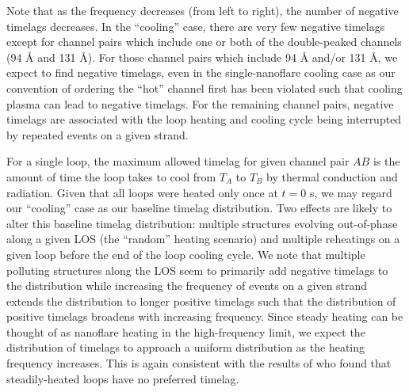 Note that as the frequency decreases (from left to right), the number of negative timelags decreases. In the ``cooling'' case, there are very few negative timelags except for channel pairs which include one or both of the double-peaked channels (94 \AA{} and 131 \AA{}). For those channel pairs which include 94 \AA{} and/or 131 \AA{}, we expect to find negative timelags, even in the single-nanoflare cooling case as our convention of ordering the ``hot'' channel first has been violated such that cooling plasma can lead to negative timelags. For the remaining channel pairs, negative timelags are associated with the loop heating and cooling cycle being interrupted by repeated events on a given strand. 

For a single loop, the maximum allowed timelag for given channel pair $AB$ is the amount of time the loop takes to cool from $T_A$ to $T_B$ by thermal conduction and radiation. Given that all loops were heated only once at $t=0$ s, we may regard our ``cooling'' case as our baseline timelag distribution. Two effects are likely to alter this baseline timelag distribution: multiple structures evolving out-of-phase along a given LOS (the ``random'' heating scenario) and multiple reheatings on a given loop before the end of the loop cooling cycle. We note that multiple polluting structures along the LOS seem to primarily add negative timelags to the distribution while increasing the frequency of events on a given strand extends the distribution to longer positive timelags such that the distribution of positive timelags broadens with increasing frequency. Since steady heating can be thought of as nanoflare heating in the high-frequency limit, we expect the distribution of timelags to approach a uniform distribution as the heating frequency increases. This is again consistent with the results of \citet{viall_signatures_2016} who found that steadily-heated loops have no preferred timelag.
